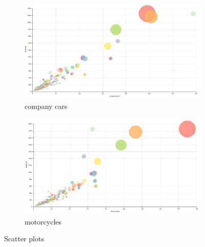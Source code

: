 \documentclass[a4paper,twoside,11pt]{article}
\begin{document}
\begin{figure}
        \begin{subfigure}[b]{0.5\textwidth}
                \includegraphics[width=\textwidth]{Visualization/CompanyCars.png}
                \caption{company cars}
                \label{fig:Company}
        \end{subfigure}
        \begin{subfigure}[b]{0.5\textwidth}
                \includegraphics[width=\textwidth]{Visualization/MotorCycles.png}
                \caption{motorcycles}
                \label{fig:MotorCycles}
        \end{subfigure}
        \caption{Scatter plots}\label{fig:scatterPlots}
\end{figure}
\newline
\newline
\newline
\newline
\newline
\newline
\newline
\newline
\newline
\newline
\newline
\newline
\newline
\end{document}
